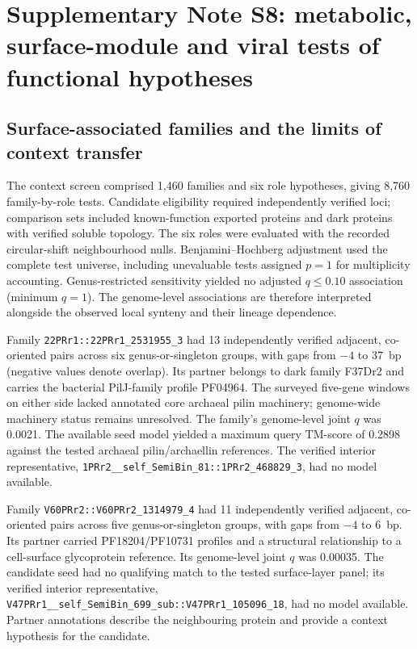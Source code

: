 \section*{Supplementary Note S8: metabolic, surface-module and viral tests of functional hypotheses}
\label{supp:mechanistic_tests}

\subsection*{Surface-associated families and the limits of context transfer}

The context screen comprised 1,460 families and six role hypotheses, giving 8,760 family-by-role tests. Candidate eligibility required independently verified loci; comparison sets included known-function exported proteins and dark proteins with verified soluble topology. The six roles were evaluated with the recorded circular-shift neighbourhood nulls. Benjamini--Hochberg adjustment used the complete test universe, including unevaluable tests assigned $p=1$ for multiplicity accounting. Genus-restricted sensitivity yielded no adjusted $q\leq0.10$ association (minimum $q=1$). The genome-level associations are therefore interpreted alongside the observed local synteny and their lineage dependence.

Family \texttt{22PRr1::\allowbreak22PRr1\_2531955\_3} had 13 independently verified adjacent, co-oriented pairs across six genus-or-singleton groups, with gaps from $-4$ to 37~bp (negative values denote overlap). Its partner belongs to dark family F37Dr2 and carries the bacterial PilJ-family profile PF04964. The surveyed five-gene windows on either side lacked annotated core archaeal pilin machinery; genome-wide machinery status remains unresolved. The family's genome-level joint $q$ was 0.0021. The available seed model yielded a maximum query TM-score of 0.2898 against the tested archaeal pilin/archaellin references. The verified interior representative, \texttt{1PRr2\_\_self\_SemiBin\_81::\allowbreak1PRr2\_468829\_3}, had no model available.

Family \texttt{V60PRr2::\allowbreak V60PRr2\_1314979\_4} had 11 independently verified adjacent, co-oriented pairs across five genus-or-singleton groups, with gaps from $-4$ to 6~bp. Its partner carried PF18204/PF10731 profiles and a structural relationship to a cell-surface glycoprotein reference. Its genome-level joint $q$ was 0.00035. The candidate seed had no qualifying match to the tested surface-layer panel; its verified interior representative, \texttt{V47PRr1\_\_self\_SemiBin\_699\_sub::\allowbreak V47PRr1\_105096\_18}, had no model available. Partner annotations describe the neighbouring protein and provide a context hypothesis for the candidate.

